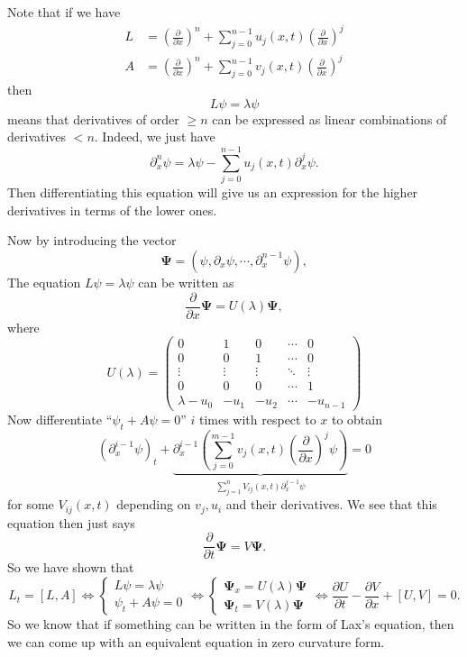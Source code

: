 \documentclass[a4paper]{article}
\begin{document}
Note that if we have
\begin{align*}
  L &= \left(\frac{\partial}{\partial x}\right)^n + \sum_{j = 0}^{n - 1}u_j(x, t) \left(\frac{\partial}{\partial x}\right)^j\\
  A &= \left(\frac{\partial}{\partial x}\right)^n + \sum_{j = 0}^{n - 1}v_j(x, t) \left(\frac{\partial}{\partial x}\right)^j
\end{align*}
then
\[
  L \psi = \lambda \psi
\]
means that derivatives of order $\geq n$ can be expressed as linear combinations of derivatives $< n$. Indeed, we just have
\[
  \partial^n_x \psi = \lambda\psi - \sum_{j = 0}^{n - 1} u_j(x, t) \partial_x^j \psi.
\]
Then differentiating this equation will give us an expression for the higher derivatives in terms of the lower ones.

Now by introducing the vector
\[
  \boldsymbol\Psi = (\psi, \partial_x \psi, \cdots, \partial^{n - 1}_x \psi),
\]
The equation $L \psi = \lambda \psi$ can be written as
\[
  \frac{\partial}{\partial x} \boldsymbol\Psi = U(\lambda) \boldsymbol\Psi,
\]
where
\[
  U(\lambda) =
  \begin{pmatrix}
    0 & 1 & 0 & \cdots & 0\\
    0 & 0 & 1 & \cdots & 0\\
    \vdots & \vdots & \vdots &\ddots & \vdots\\
    0 & 0 & 0 & \cdots & 1\\
    \lambda - u_0 & - u_1 & -u_2 & \cdots & - u_{n - 1}
  \end{pmatrix}
\]
Now differentiate ``$\psi_t + A\psi = 0$'' $i$ times with respect to $x$ to obtain
\[
  (\partial_x^{i - 1} \psi)_t + \underbrace{\partial_x^{i - 1} \left(\sum_{j = 0}^{m - 1} v_j(x, t) \left(\frac{\partial}{\partial x}\right)^j \psi\right)}_{\sum_{j = 1}^n V_{ij}(x, t) \partial^{j - 1}_x \psi} = 0
\]
for some $V_{ij}(x, t)$ depending on $v_j, u_i$ and their derivatives. We see that this equation then just says
\[
  \frac{\partial}{\partial t}\boldsymbol\Psi = V \boldsymbol\Psi.
\]
So we have shown that
\[
  L_t = [L, A] \Leftrightarrow
  \begin{cases}
    L\psi = \lambda \psi\\
    \psi_t + A\psi = 0
  \end{cases} \Leftrightarrow
  \begin{cases}
    \boldsymbol\Psi_x = U(\lambda) \boldsymbol\Psi\\
    \boldsymbol\Psi_t = V(\lambda) \boldsymbol\Psi
  \end{cases} \Leftrightarrow
  \frac{\partial U}{\partial t} - \frac{\partial V}{\partial x} + [U, V] = 0.
\]
So we know that if something can be written in the form of Lax's equation, then we can come up with an equivalent equation in zero curvature form.
\end{document}
